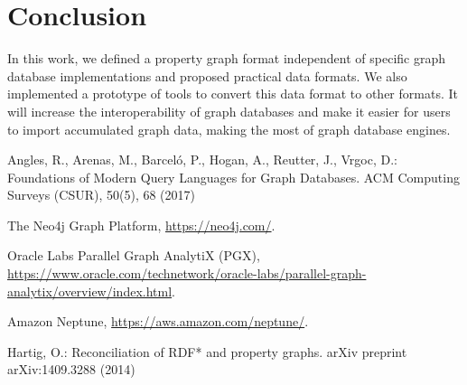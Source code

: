 \documentclass[runningheads]{llncs}
\begin{document}
\section{Conclusion}
In this work, we defined a property graph format independent of specific graph database implementations and proposed practical data formats. We also implemented a prototype of tools to convert this data format to other formats. 
It will increase the interoperability of graph databases and make it easier for users to import accumulated graph data, making the most of graph database engines.

%
%
%
% 
% 
%
\begin{thebibliography}{8}

Angles, R., Arenas, M., Barceló, P., Hogan, A., Reutter, J., Vrgoc, D.: Foundations of Modern Query Languages for Graph Databases. ACM Computing Surveys (CSUR), 50(5), 68 (2017)

The Neo4j Graph Platform, \url{https://neo4j.com/}.

Oracle Labs Parallel Graph AnalytiX (PGX), \url{https://www.oracle.com/technetwork/oracle-labs/parallel-graph-analytix/overview/index.html}.

Amazon Neptune, \url{https://aws.amazon.com/neptune/}.

Hartig, O.: Reconciliation of RDF* and property graphs. arXiv preprint arXiv:1409.3288 (2014)

\end{thebibliography}
\end{document}
